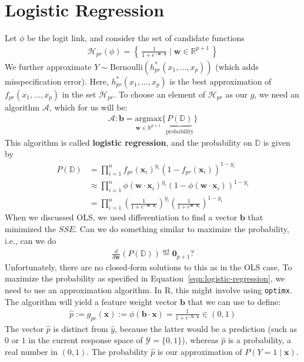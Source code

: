 \documentclass[12pt, a4paper]{article}
\theoremstyle{definition}
\begin{document}
	\section*{Logistic Regression}
	Let $\phi$ be the logit link, and consider the set of candidate functions
	\begin{align*}
		\mathcal{H}_{pr}(\phi) = \left\{\,
		\frac{1}{1 + e^{-\bm{w}\cdot\bm{x}}} \mid \bm{w}\in \mathbb{R}^{p+1}
		\,\right\}
	\end{align*}
	We further approximate $Y\sim \text{Bernoulli}(h^*_{pr}(x_1,\ldots,x_p))$ (which adds
	misspecification error). Here, $h^*_{pr}(x_1,\ldots,x_p)$ is the best approximation
	of $f_{pr}(x_1,\ldots,x_p)$ in the set $\mathcal{H}_{pr}$. To choose an element
	of $\mathcal{H}_{pr}$ as our $g$, we need an algorithm $\mathcal{A}$, which
	for us will be:
	\begin{align}
		\mathcal{A}:\bm{b}
		= \underset{\bm{w}\in \mathbb{R}^{p+1}}{\text{argmax}}\{\underbrace{P(\mathbb{D})}_{\text{probability}}\}
		\label{eqn:logistic-regression}
	\end{align}
	This algorithm is called \textbf{logistic regression}, and the probability
	on $\mathbb{D}$ is given by
	\begin{align*}
		P(\mathbb{D}) 
		&= \prod_{i=1}^{n}f_{pr}(\bm{x}_i)^{y_i}(1 - f_{pr}(\bm{x}_i))^{1-y_i}\\
		&\approx \prod_{i=1}^{n}\phi(\bm{w}\cdot \bm{x}_i)^{y_i}(1 - \phi(\bm{w}\cdot \bm{x}_i))^{1-y_i}\\
		&= \prod_{i=1}^{n}\left(\frac{1}{1 + e^{-\bm{w}\cdot \bm{x}_i}}\right)^{y_i}
		\left(\frac{1}{1 + e^{\bm{w}\cdot \bm{x}_i}}\right)^{1-y_i}
	\end{align*}
	When we discussed OLS, we used differentiation to find a vector $\bm{b}$
	that minimized the $SSE$. Can we do something similar to maximize the probability,
	i.e., can we do
	\begin{align*}
		\frac{d}{d\bm{w}}\left(P(\mathbb{D})\right)\stackrel{\text{set}}{=}\bm{0}_{p+1}?
	\end{align*}
	Unfortunately, there are no closed-form solutions to this as in the OLS case.
	To maximize the probability as specified in Equation~\ref{eqn:logistic-regression},
	we need to use an approximation algorithm. In R, this might involve using
	\texttt{optimx}. The algorithm will yield a feature weight vector $\bm{b}$
	that we can use to define:
	\begin{align*}
		\hat{p} := g_{pr}(\bm{x}) := \phi(\bm{b}\cdot \bm{x}) = \frac{1}{1 + e^{-\bm{b}\cdot \bm{x}}}
		\in (0,1)
	\end{align*}
	The vector $\hat{p}$ is distinct from $\hat{y}$, because the latter would be
	a prediction (such as $0$ or $1$ in the current response space of $\mathcal{Y}=\{0,1\}$),
	whereas $\hat{p}$ is a probability, a real number in $(0,1)$. The probability
	$\hat{p}$ is our approximation of $P(Y=1\mid \bm{x})$.
	
\end{document}
